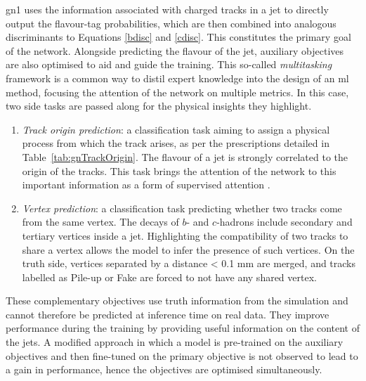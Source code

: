 \gls{gn1} uses the information associated with charged tracks in a jet to directly output the flavour-tag probabilities, which are then combined into analogous discriminants to Equations \ref{bdisc} and \ref{cdisc}. This constitutes the primary goal of the network. Alongside predicting the flavour of the jet, auxiliary objectives are also optimised to aid and guide the training. This so-called \textit{multitasking} framework is a common way to distil expert knowledge into the design of an \gls{ml} method, focusing the attention of the network on multiple metrics. In this case, two side tasks are passed along for the physical insights they highlight.
\begin{enumerate}
\item \textit{Track origin prediction}: a classification task aiming to assign a physical process from which the track arises, as per the prescriptions detailed in Table~\ref{tab:gnTrackOrigin}. The flavour of a jet is strongly correlated to the origin of the tracks. This task brings the attention of the network to this important information as a form of supervised attention \cite{hwang2021selfsupervised}.
\item \textit{Vertex prediction}: a classification task predicting whether two tracks come from the same vertex. The decays of $b$- and $c$-hadrons include secondary and tertiary vertices inside a jet. Highlighting the compatibility of two tracks to share a vertex allows the model to infer the presence of such vertices. On the truth side, vertices separated by a distance < 0.1 mm are merged, and tracks labelled as Pile-up or Fake are forced to not have any shared vertex.
\end{enumerate}
These complementary objectives use truth information from the simulation and cannot therefore be predicted at inference time on real data. They improve performance during the training by providing useful information on the content of the jets. A modified approach in which a model is pre-trained on the auxiliary objectives and then fine-tuned on the primary objective is not observed to lead to a gain in performance, hence the objectives are optimised simultaneously. \\

